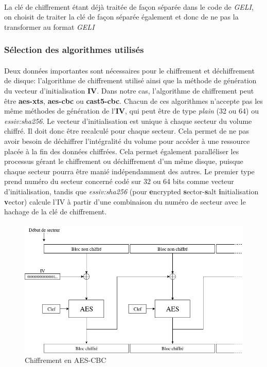 \paragraph{}
La clé de chiffrement étant déjà traitée de façon séparée dans le code de 
{\em GELI}, on choisit de traiter la clé de façon séparée également et donc de 
ne pas la transformer au format {\em GELI}


\subsubsection{Sélection des algorithmes utilisés}
\paragraph{}
Deux données importantes sont nécessaires pour le chiffrement et déchiffrement
de disque: l'algorithme de chiffrement utilisé ainsi que la méthode de
génération du vecteur d'initialisation \textbf{IV}. Dans notre cas, l'algorithme
de chiffrement peut être \textbf{aes-xts}, \textbf{aes-cbc} ou
\textbf{cast5-cbc}. Chacun de ces algorithmes n'accepte pas les même méthodes de
génération de l'\textbf{IV}, qui peut être de type \textit{plain} (32 ou 64) ou
\textit{essiv:sha256}. Le vecteur d'initialisation est unique à chaque secteur
du volume chiffré. Il doit donc être recalculé pour chaque secteur. Cela permet
de ne pas avoir besoin de déchiffrer l'intégralité du volume pour accéder à une
ressource placée à la fin des données chiffrées. Cela permet également
paralléliser les processus gérant le chiffrement ou déchiffrement d'un même
disque, puisque chaque secteur pourra être manié indépendamment des autres. Le
premier type prend numéro du secteur concerné codé sur 32 ou 64 bits comme
vecteur d'initialisation, tandis que \textit{essiv:sha256} (pour
\textbf{e}ncrypted \textbf{s}ector-\textbf{s}alt \textbf{i}nitialisation
\textbf{v}ector) calcule l'IV à partir d'une combinaison du numéro de secteur
avec le hachage de la clé de chiffrement.
\paragraph{}
\begin{figure}[h]
\centering
\includegraphics[width=.9\linewidth]{choix_developpement/aes_cbc.png}
\caption{\label{fig:aes_cbc}Chiffrement en AES-CBC}
\end{figure}

